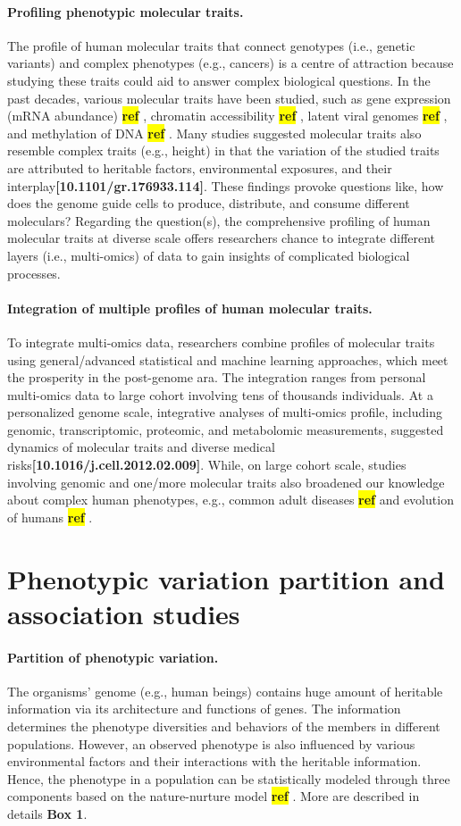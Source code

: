 \documentclass[12pt,usletter,fancy]{elegantbook}
\newcommand{\reqref}[1][ref]{
  \colorbox{yellow}{\textbf{#1}}
}
\begin{document}
\paragraph*{Profiling phenotypic molecular traits.}
The profile of human molecular traits that connect genotypes (i.e., genetic variants) and complex phenotypes (e.g., cancers) is a centre of attraction because studying these traits could aid to answer complex biological questions.
In the past decades, various molecular traits have been studied, such as gene expression (mRNA abundance) \reqref, chromatin accessibility \reqref, latent viral genomes \reqref, and methylation of DNA \reqref.
Many studies suggested molecular traits also resemble complex traits (e.g., height) in that the variation of the studied traits are attributed to heritable factors, environmental exposures, and their interplay\textbf{[10.1101/gr.176933.114]}.
These findings provoke questions like, how does the genome guide cells to produce, distribute, and consume different moleculars?
Regarding the question(s), the comprehensive profiling of human molecular traits at diverse scale offers researchers chance to integrate different layers (i.e., multi-omics) of data to gain insights of complicated biological processes.

\paragraph*{Integration of multiple profiles of human molecular traits.}
To integrate multi-omics data, researchers combine profiles of molecular traits using general/advanced statistical and machine learning approaches, which meet the prosperity in the post-genome ara.
The integration ranges from personal multi-omics data to large cohort involving tens of thousands individuals.
At a personalized genome scale, integrative analyses of multi-omics profile, including genomic, transcriptomic, proteomic, and metabolomic measurements, suggested dynamics of molecular traits and diverse medical risks\textbf{[10.1016/j.cell.2012.02.009]}.
While, on large cohort scale, studies involving genomic and one/more molecular traits also broadened our knowledge about complex human phenotypes, e.g., common adult diseases \reqref and evolution of humans \reqref.


\section*{Phenotypic variation partition and association studies}
\paragraph*{Partition of phenotypic variation.}
The organisms' genome (e.g., human beings) contains huge amount of heritable information via its architecture and functions of genes.
The information determines the phenotype diversities and behaviors of the members in different populations.
However, an observed phenotype is also influenced by various environmental factors and their interactions with the heritable information.
Hence, the phenotype in a population can be statistically modeled through three components based on the nature-nurture model\reqref.
More are described in details \textbf{Box 1}.
\end{document}
